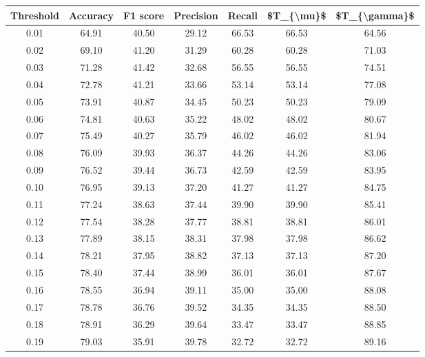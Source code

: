 \begin{tabular}{|c|c|c|c|c|c|c|}
\hline
 Threshold &  Accuracy &  F1 score &  Precision &  Recall &  \$T\_\{\textbackslash mu\}\$ &  \$T\_\{\textbackslash gamma\}\$ \\
\hline
      0.01 &     64.91 &     40.50 &      29.12 &   66.53 &      66.53 &         64.56 \\
      0.02 &     69.10 &     41.20 &      31.29 &   60.28 &      60.28 &         71.03 \\
      0.03 &     71.28 &     41.42 &      32.68 &   56.55 &      56.55 &         74.51 \\
      0.04 &     72.78 &     41.21 &      33.66 &   53.14 &      53.14 &         77.08 \\
      0.05 &     73.91 &     40.87 &      34.45 &   50.23 &      50.23 &         79.09 \\
      0.06 &     74.81 &     40.63 &      35.22 &   48.02 &      48.02 &         80.67 \\
      0.07 &     75.49 &     40.27 &      35.79 &   46.02 &      46.02 &         81.94 \\
      0.08 &     76.09 &     39.93 &      36.37 &   44.26 &      44.26 &         83.06 \\
      0.09 &     76.52 &     39.44 &      36.73 &   42.59 &      42.59 &         83.95 \\
      0.10 &     76.95 &     39.13 &      37.20 &   41.27 &      41.27 &         84.75 \\
      0.11 &     77.24 &     38.63 &      37.44 &   39.90 &      39.90 &         85.41 \\
      0.12 &     77.54 &     38.28 &      37.77 &   38.81 &      38.81 &         86.01 \\
      0.13 &     77.89 &     38.15 &      38.31 &   37.98 &      37.98 &         86.62 \\
      0.14 &     78.21 &     37.95 &      38.82 &   37.13 &      37.13 &         87.20 \\
      0.15 &     78.40 &     37.44 &      38.99 &   36.01 &      36.01 &         87.67 \\
      0.16 &     78.55 &     36.94 &      39.11 &   35.00 &      35.00 &         88.08 \\
      0.17 &     78.78 &     36.76 &      39.52 &   34.35 &      34.35 &         88.50 \\
      0.18 &     78.91 &     36.29 &      39.64 &   33.47 &      33.47 &         88.85 \\
      0.19 &     79.03 &     35.91 &      39.78 &   32.72 &      32.72 &         89.16 \\

\end{tabular}
